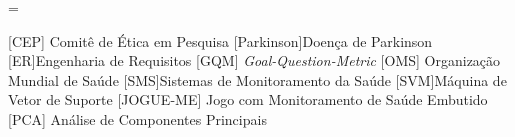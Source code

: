 \documentclass[a4paper,titlepage]{copin}
\begin{document}
\pagestyle{fancy}
\addtolength{\headwidth}{\marginparsep}\addtolength{\headwidth}{\marginparwidth}\headwidth = \textwidth
\renewcommand{\chaptermark}[1]{\markboth{#1}{}}
\renewcommand{\sectionmark}[1]{\markright{\thesection\ #1}}\lhead[\fancyplain{}{\bfseries\thepage}]%
	     {\fancyplain{}{\emph{\rightmark}}}\rhead[\fancyplain{}{\bfseries\leftmark}]%
             {\fancyplain{}{\bfseries\thepage}}\cfoot{}


\Sumario
\ListadeSimbolos
\begin{acronym}
	 [CEP] {Comitê de Ética em Pesquisa}
	[Parkinson]{Doença de Parkinson}
	[ER]{Engenharia de Requisitos}
	 [GQM] {\textit{Goal-Question-Metric}}
	 [OMS] {Organização Mundial de Saúde}	
	 [SMS]{Sistemas de Monitoramento da Saúde}
	 [SVM]{Máquina de Vetor de Suporte}
	 [JOGUE-ME] {Jogo com Monitoramento de Saúde Embutido}
	 [PCA] {Análise de Componentes Principais}
	
	
\end{acronym}
\end{document}
